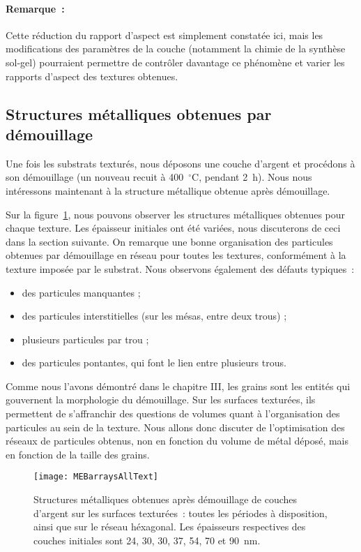 \paragraph*{Remarque~:} Cette réduction du rapport d'aspect est simplement constatée ici, mais les modifications des paramètres de la couche (notamment la chimie de la synthèse sol-gel) pourraient permettre de contrôler davantage ce phénomène et varier les rapports d'aspect des textures obtenues.\par 

	\subsection{Structures métalliques obtenues par démouillage}
Une fois les substrats texturés, nous déposons une couche d’argent et procédons à son démouillage (un nouveau recuit à 400~$^\circ$C, pendant 2~h). Nous nous intéressons maintenant à la structure métallique obtenue après démouillage.\par 
Sur la figure~\ref{MEBarraysAllText}, nous pouvons observer les structures métalliques obtenues pour chaque texture. Les épaisseur initiales ont été variées, nous discuterons de ceci dans la section suivante. On remarque une bonne organisation des particules obtenues par démouillage en réseau pour toutes les textures, conformément à la texture imposée par le substrat. Nous observons également des défauts typiques~:
\begin{itemize}
\item des particules manquantes ;
\item des particules interstitielles (sur les mésas, entre deux trous) ;
\item plusieurs particules par trou ;
\item des particules pontantes, qui font le lien entre plusieurs trous.
\end{itemize}
Comme nous l'avons démontré dans le chapitre III, les grains sont les entités qui gouvernent la morphologie du démouillage. Sur les surfaces texturées, ils permettent de s'affranchir des questions de volumes quant à l'organisation des particules au sein de la texture. Nous allons donc discuter de l'optimisation des réseaux de particules obtenus, non en fonction du volume de métal déposé, mais en fonction de la taille des grains.\par 
\begin{figure}[!htb]
\centering
\texttt{[image: MEBarraysAllText]}
\caption{Structures métalliques obtenues après démouillage de couches d’argent sur les surfaces texturées~: toutes les périodes à disposition, ainsi que sur le réseau héxagonal. Les épaisseurs respectives des couches initiales sont 24, 30, 30, 37, 54, 70 et 90~nm.}
\label{MEBarraysAllText}
\end{figure}


